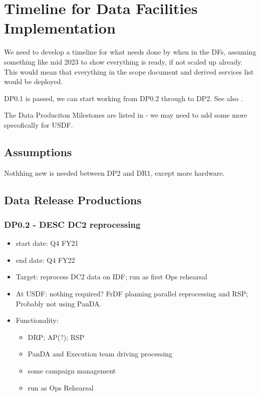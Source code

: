
\section{Timeline for Data Facilities Implementation}\label{sec:timeline}

We need to develop a timeline for what needs done by when in the DFs, assuming something like mid 2023 to show everything is ready, if not scaled up already.
This would mean that everything in the scope document and derived services list would be deployed.

DP0.1 is passed,  we can start working from DP0.2  through to DP2.
See also \cite{RDO-011}.

The Data Produciton Milestones are listed in  - we may need to add some more specofically for USDF.


\subsection{Assumptions}

Nothhing new is needed between DP2 and DR1, except more hardware.

\subsection{Data Release Productions}
\subsubsection{ DP0.2 - DESC DC2 reprocessing}
\begin{itemize}
\item start date: Q4 FY21
\item end date: Q4 FY22
\item Target: reprocess DC2 data on IDF; run as first Ops rehearsal
\item At USDF: nothing required? FrDF planning parallel reprocessing and RSP; Probably not using PanDA.
\item Functionality:
\begin{itemize}
\item DRP; AP(?); RSP
\item PanDA and Execution team driving processing
\item some campaign management
\item run as Ops Rehearsal
\end{itemize}
\end{itemize}
